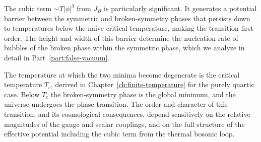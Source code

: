 
The cubic term $\sim T|\phi|^3$ from $J_B$ is particularly significant.
It generates a potential barrier between the symmetric and broken-symmetry
phases that persists down to temperatures below the naive critical
temperature, making the transition first order. The height and width of
this barrier determine the nucleation rate of bubbles of the broken phase
within the symmetric phase, which we analyze in detail in
Part~\ref{part:false-vacuum}.

The temperature at which the two minima become degenerate is the
critical temperature $T_c$, derived in Chapter~\ref{ch:finite-temperature}
for the purely quartic case. Below $T_c$ the broken-symmetry phase is
the global minimum, and the universe undergoes the phase transition.
The order and character of this transition, and its cosmological
consequences, depend sensitively on the relative magnitudes of the
gauge and scalar couplings, and on the full structure of the effective
potential including the cubic term from the thermal bosonic loop.

